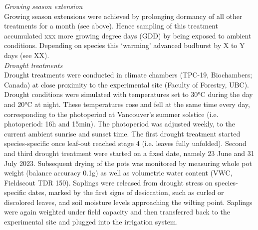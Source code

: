 \documentclass{article}
\begin{document}
	\textit{Growing season extension} \\
	Growing season extensions were achieved by prolonging dormancy of all other treatments for a month (see above). Hence sampling of this treatment accumulated xxx more growing degree days (GDD) by being exposed to ambient conditions. Depending on species this `warming' advanced budburst by X to Y days (see XX).\\
	
	\textit{Drought treatments} \\
	Drought treatments were conducted in climate chambers (TPC-19, Biochambers; Canada) at close proximity to the experimental site (Faculty of Forestry, UBC). Drought conditions were simulated with temperatures set to 30°C during the day and 20°C at night. These temperatures rose and fell at the same time every day, corresponding to the photoperiod at Vancouver’s summer solstice (i.e. photoperiod: 16h and 15min). The photoperiod was adjusted weekly, to the current ambient sunrise and sunset time. 
	The first drought treatment started species-specific once leaf-out reached stage 4 (i.e. leaves fully unfolded). Second and third drought treatment were started on a fixed date, namely 23 June and 31 July 2023. Subsequent drying of the pots was monitored by measuring whole pot weight (balance accuracy 0.1g) as well as volumetric water content (VWC, Fieldscout TDR 150). Saplings were released from drought stress on species-specific dates, marked by the first signs of desiccation, such as curled or discolored leaves, and soil moisture levels approaching the wilting point. %
	Saplings were again weighted under field capacity and then transferred back to the experimental site and plugged into the irrigation system. \\
	
	
\end{document}
